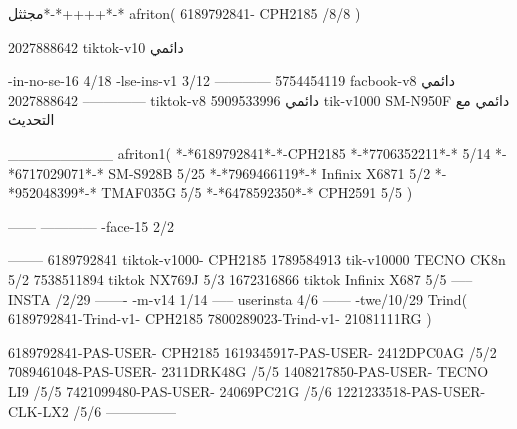 مجثثل*-*++++*-*
afriton(
6189792841- CPH2185  /8/8
)

2027888642 tiktok-v10
دائمي

-in-no-se-16 4/18
-lse-ins-v1 3/12
------------
5754454119 facbook-v8
دائمي
--------------
2027888642 tiktok-v8
دائمي
5909533996 tik-v1000  SM-N950F
دائمي مع التحديث

__________
afriton1(
*-*6189792841*-*-CPH2185
*-*7706352211*-* 5/14
*-*6717029071*-*  SM-S928B 5/25
*-*7969466119*-* Infinix X6871 5/2
*-*952048399*-* TMAF035G 5/5
*-*6478592350*-* CPH2591 5/5
)


------
------------
-face-15 2/2

--------
6189792841 tiktok-v1000- CPH2185 
1789584913 tik-v10000  TECNO CK8n 5/2
7538511894 tiktok NX769J  5/3
1672316866 tiktok Infinix X687  5/5
-----
 INSTA /2/29
-------
-m-v14 1/14
-----
userinsta 4/6
------
-twe/10/29
Trind(
6189792841-Trind-v1- CPH2185 
7800289023-Trind-v1- 21081111RG \5\5
)

6189792841-PAS-USER- CPH2185 
1619345917-PAS-USER- 2412DPC0AG /5/2
7089461048-PAS-USER- 2311DRK48G /5/5
1408217850-PAS-USER- TECNO LI9 /5/5
7421099480-PAS-USER- 24069PC21G /5/6
1221233518-PAS-USER- CLK-LX2 /5/6
    ---------------

